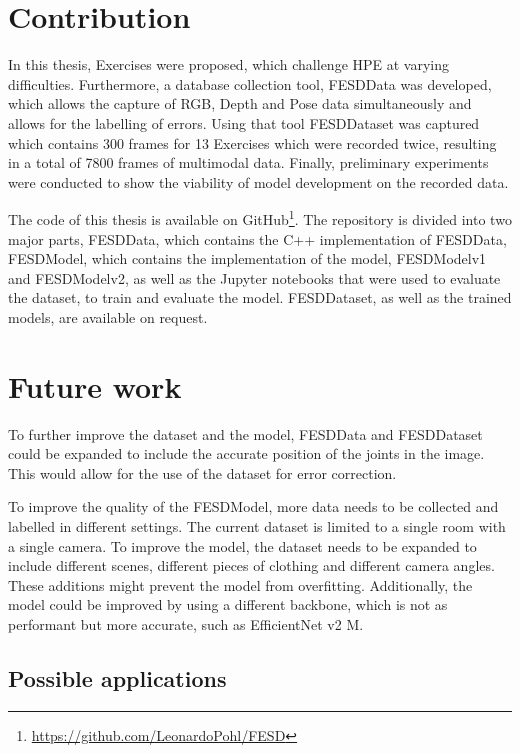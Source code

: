 \section{Contribution}

In this thesis, Exercises were proposed, which challenge HPE at varying difficulties. Furthermore, a database collection tool, FESDData was developed, which allows the capture of RGB, Depth and Pose data simultaneously and allows for the labelling of errors. Using that tool FESDDataset was captured which contains 300 frames for 13 Exercises which were recorded twice, resulting in a total of 7800 frames of multimodal data. Finally, preliminary experiments were conducted to show the viability of model development on the recorded data.

The code of this thesis is available on GitHub\footnote{\url{https://github.com/LeonardoPohl/FESD}}. The repository is divided into two major parts, FESDData, which contains the C++ implementation of FESDData, FESDModel, which contains the implementation of the model, FESDModelv1 and FESDModelv2, as well as the Jupyter notebooks that were used to evaluate the dataset, to train and evaluate the model. FESDDataset, as well as the trained models, are available on request.  

\section{Future work}
\label{sec:future_work}

To further improve the dataset and the model, FESDData and FESDDataset could be expanded to include the accurate position of the joints in the image. This would allow for the use of the dataset for error correction.

To improve the quality of the FESDModel, more data needs to be collected and labelled in different settings. The current dataset is limited to a single room with a single camera. To improve the model, the dataset needs to be expanded to include different scenes, different pieces of clothing and different camera angles. These additions might prevent the model from overfitting. Additionally, the model could be improved by using a different backbone, which is not as performant but more accurate, such as EfficientNet v2 M.

\subsection{Possible applications}

